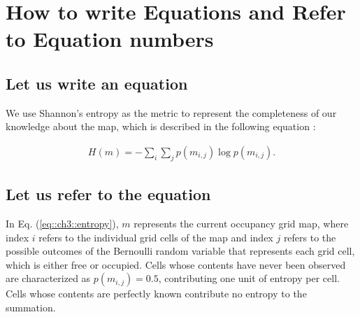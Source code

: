 





\section{How to write Equations and Refer to Equation numbers}
\label{sec::ch4::problem-def}
\subsection{Let us write an equation}
\label{sec::ch3::entro-info}
We use Shannon's entropy as the metric to represent the completeness of our knowledge about the map, which is described in the following equation :

\begin{align}
	\label{eq::ch3::entropy}
	H(m) = - \sum_i \sum_j p(m_{i,j})  \log p(m_{i,j}).
\end{align}
\subsection{Let us refer to the equation}
In Eq. (\ref{eq::ch3::entropy}), $m$ represents the current occupancy grid map, where index $i$ refers to the individual grid cells of the map and index $j$ refers to the possible outcomes of the Bernoulli random variable that represents each grid cell, which is either free or occupied. Cells whose contents have never been observed are characterized as $p(m_{i,j}) = 0.5$, contributing one unit of entropy per cell. Cells whose contents are perfectly known contribute no entropy to the summation.


